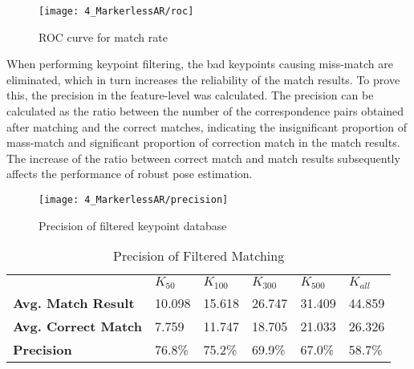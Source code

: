 \begin{figure}[ht!]
\centering
\texttt{[image: 4\_MarkerlessAR/roc]}
\caption{ROC curve for match rate}
\label{fig:markerless_roc}
\end{figure}


When performing keypoint filtering, the bad keypoints causing miss-match are eliminated, which in turn increases the reliability of the match results. To prove this, the precision\cite{heinly_comparative_2012} in the feature-level was calculated. The precision can be calculated as the ratio between the number of the correspondence pairs obtained after matching and the correct matches, indicating the insignificant proportion of mass-match and significant proportion of correction match in the match results. The increase of the ratio between correct match and match results subsequently affects the performance of robust pose estimation. 


\begin{figure}[t!]
\centering
\texttt{[image: 4\_MarkerlessAR/precision]}
\caption{Precision of filtered keypoint database}
\label{fig:markerless_precision}
\end{figure}

\begin{table}[b!]
\centering
\begin{tabular}{llllll}
\hline
\textbf{}                   & \textbf{$K_{50}$} & \textbf{$K_{100}$} & \textbf{$K_{300}$} & \textbf{$K_{500}$} & \textbf{$K_{all}$} \\
\textbf{Avg. Match Result}  & 10.098            & 15.618             & 26.747             & 31.409             & 44.859             \\
\textbf{Avg. Correct Match} & 7.759             & 11.747             & 18.705             & 21.033             & 26.326             \\
\textbf{Precision}          & 76.8\%            & 75.2\%             & 69.9\%             & 67.0\%             & 58.7\%             \\ \hline
\end{tabular}
  \caption{Precision of Filtered Matching}
  \label{tab:markerless_precision}
\end{table}

